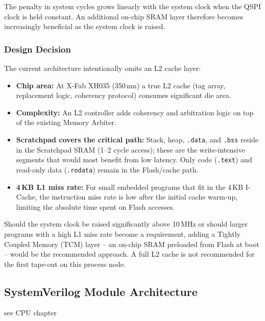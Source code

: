 The penalty in system cycles grows linearly with the system clock when
the QSPI clock is held constant.
An additional on-chip SRAM layer therefore becomes increasingly
beneficial as the system clock is raised.

\subsubsection{Design Decision}
\label{subsubsec:l2Decision}

The current architecture intentionally omits an L2 cache layer:

\begin{itemize}
  \item \textbf{Chip area:} At X-Fab XH035 (350\,nm) a true L2 cache
    (tag array, replacement logic, coherency protocol) consumes
    significant die area.
  \item \textbf{Complexity:} An L2 controller adds coherency and
    arbitration logic on top of the existing Memory Arbiter.
  \item \textbf{Scratchpad covers the critical path:}
    Stack, heap, \texttt{.data}, and \texttt{.bss} reside in the
    Scratchpad SRAM (1--2 cycle access); these are the write-intensive
    segments that would most benefit from low latency.
    Only code (\texttt{.text}) and read-only data (\texttt{.rodata})
    remain in the Flash/cache path.
  \item \textbf{4\,KB L1 miss rate:} For small embedded programs that
    fit in the 4\,KB I-Cache, the instruction miss rate is low after
    the initial cache warm-up, limiting the absolute time spent on
    Flash accesses.
\end{itemize}

Should the system clock be raised significantly above 10\,MHz or should
larger programs with a high L1 miss rate become a requirement, adding a
Tightly Coupled Memory (TCM) layer -- an on-chip SRAM preloaded from
Flash at boot -- would be the recommended approach.
A full L2 cache is not recommended for the first tape-out on this
process node.

\subsection{SystemVerilog Module Architecture}
\label{subsec:svModules}
see CPU chapter


